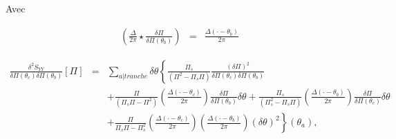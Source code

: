 	Avec 
	
	\begin{eqnarray}
			\left  ( \frac{\Delta}{2\pi} \star \frac{\delta \Pi}{\delta \Pi(\theta_b) }  \right ) & = & 	\frac{\Delta ( \cdot - \theta_b )}{2\pi}
		\end{eqnarray}
	
	\begin{eqnarray}
		\frac{ \delta^2 S_{YY} }{ \delta \Pi(\theta_c) \delta \Pi(\theta_b)  } [\Pi ]  & = & \sum_{a \vert tranche}   \delta \theta \left \{  \frac{\Pi_s}{(\Pi^2  - \Pi_s\Pi)} \frac{(\delta \Pi)^2}{ \delta \Pi(\theta_c) \delta \Pi(\theta_b)  } \right . \\
		&  &  +  \left . \frac{\Pi }{(\Pi_s\Pi -\Pi^2) } \left ( \frac{\Delta ( \cdot - \theta_c )}{2\pi}   \right ) \frac{\delta \Pi}{\delta \Pi(\theta_b)} \delta \theta+ \frac{\Pi_s }{( \Pi_s^2 - \Pi_s \Pi) } \left (  \frac{\Delta ( \cdot - \theta_b )}{2\pi} \right ) \frac{\delta \Pi}{\delta \Pi(\theta_c)} \delta \theta \right . \\
		& & + \left .  \frac{\Pi }{\Pi_s\Pi - \Pi_s^2 }\left (  \frac{\Delta ( \cdot - \theta_c )}{2\pi} \right )\left (  \frac{\Delta ( \cdot - \theta_b )}{2\pi} \right )( \delta \theta)^2  \right \}(\theta_a),	
	\end{eqnarray}
	
	
		


		
%	
	
	
